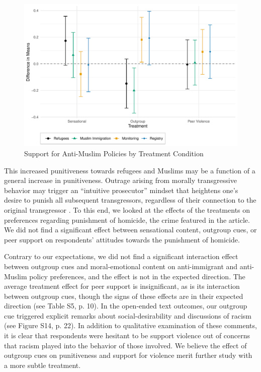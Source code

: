 \begin{figure}[!htbp]
  \centering
  \caption{Support for Anti-Muslim Policies by Treatment Condition}
  \includegraphics[width=.835\textwidth]{figures/ATE_punitive.pdf}
\end{figure}

This increased punitiveness towards refugees and Muslims may be a function of a general increase in punitiveness. Outrage arising from morally transgressive behavior may trigger an ``intuitive prosecutor'' mindset that heightens one's desire to punish all subsequent transgressors, regardless of their connection to the original transgressor \citep{crockett2017moral, goldberg1999rage, tetlock2007}. To this end, we looked at the effects of the treatments on preferences regarding punishment of homicide, the crime featured in the article. We did not find a significant effect between sensational content, outgroup cues, or peer support on respondents' attitudes towards the punishment of homicide. 

Contrary to our expectations, we did not find a significant interaction effect between outgroup cues and moral-emotional content on anti-immigrant and anti-Muslim policy preferences, and the effect is not in the expected direction. The average treatment effect for peer support is insignificant, as is its interaction between outgroup cues, though the signs of these effects are in their expected direction (see Table S5, p. 10). In the open-ended text outcomes, our outgroup cue triggered explicit remarks about social-desirability and discussions of racism (see Figure S14, p. 22). In addition to qualitative examination of these comments, it is clear that respondents were hesitant to be support violence out of concerns that racism played into the behavior of those involved.  We believe the effect of outgroup cues on punitiveness and support for violence merit further study with a more subtle treatment.

